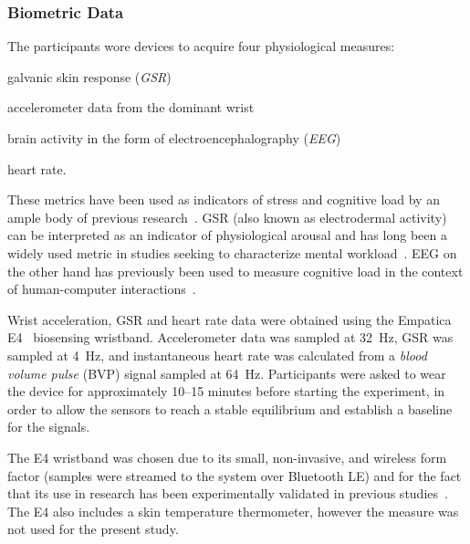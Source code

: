 \documentclass[10pt,letterpaper]{article}
\begin{document}
\subsubsection{Biometric Data}
The participants wore devices to acquire four physiological measures:
\begin{enumerate*}[itemjoin={{, }},
                  itemjoin*={{, and }},
                  label={{(\arabic*)}}]
  \item galvanic skin response (\emph{GSR})
  \item accelerometer data from the dominant wrist
  \item brain activity in the form of electroencephalography (\emph{EEG})
  \item heart rate.
\end{enumerate*}

These metrics have been used as indicators of stress and cognitive load by an ample body of previous research~\cite{khawadi2015:usinggsrtrust,kuikkaniemi2010:biofeedback,solovey2014:classifyingdriverworkload}.
GSR (also known as electrodermal activity) can be interpreted as an indicator of physiological arousal and has long been a widely used metric in studies seeking to characterize mental workload~\cite{peterson1907psycho,Healey2005,Son2010,khawadi2015:usinggsrtrust,kuikkaniemi2010:biofeedback,solovey2014:classifyingdriverworkload,}.
EEG on the other hand has previously been used to measure cognitive load in the context of human-computer interactions~\cite{Antonenko2010,Grimes2008,kumar2016measurement}.

Wrist acceleration, GSR and heart rate data were obtained using the Empatica E4~\cite{empatica:e4} biosensing wristband.
Accelerometer data was sampled at \SI{32}{\hertz},
GSR was sampled at \SI{4}{\hertz}, and instantaneous heart rate was calculated from a \emph{blood volume pulse} (BVP) signal sampled at \SI{64}{\hertz}.
Participants were asked to wear the device for approximately 10--15 minutes before starting the experiment, in order to allow the sensors to reach a stable equilibrium and establish a baseline for the signals.

The E4 wristband was chosen due to its small, non-invasive, and wireless form factor (samples were streamed to the system over Bluetooth LE) and for the fact that its use in research has been experimentally validated in previous studies~\cite{ragot2017emotion, mccarthy2016validation}.
The E4 also includes a skin temperature thermometer, however the measure was not used for the present study.
\end{document}
